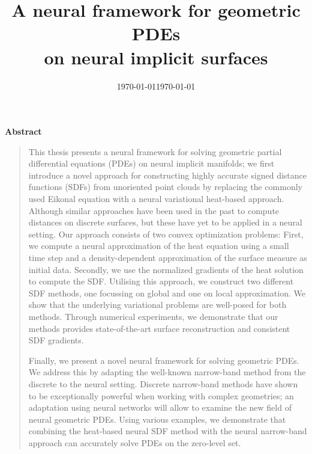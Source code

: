 \documentclass[12pt,openany]{book}
\date{\today}
\title{A neural framework for geometric PDEs\\on neural implicit surfaces}
\date{\today}
\theoremstyle{plainnormal}
\newenvironment{abstract}{
  \cleardoublepage
  \null\vfill
  \begin{center}\bfseries Abstract\end{center}
  \begin{quote}
}{
  \end{quote}
  \vfill\null
  \cleardoublepage
}
\theoremstyle{remark}
\begin{document}
\pagestyle{empty}

\maketitle

\pagestyle{headings}
\setcounter{page}{5}

\begingroup
\let\clearpage\relax

\begin{abstract}
This thesis presents a neural framework for solving geometric partial differential equations (PDEs) on neural implicit manifolds; we first introduce a novel approach for constructing highly accurate signed distance functions (SDFs) from unoriented point clouds by replacing the commonly used Eikonal equation with a neural variational heat-based approach. Although similar approaches have been used in the past to compute distances on discrete surfaces, but these have yet to be applied in a neural setting. Our approach consists of two convex optimization problems: First, we compute a neural approximation of the heat equation using a small time step and a density-dependent approximation of the surface measure as initial data. Secondly, we use the normalized gradients of the heat solution to compute the SDF. Utilising this approach, we construct two different SDF methods, one focussing on global and one on local approximation. We show that the underlying variational problems are well-posed for both methods.
Through numerical experiments, we demonstrate that our methods provides state-of-the-art surface reconstruction and consistent SDF gradients.\par
Finally, we present a novel neural framework for solving geometric PDEs. We address this by adapting the well-known narrow-band method from the discrete to the neural setting. Discrete narrow-band methods have shown to be exceptionally powerful when working with complex geometries; an adaptation using neural networks will allow to examine the new field of neural geometric PDEs. Using various examples, we demonstrate that combining the heat-based neural SDF method with the neural narrow-band approach can accurately solve PDEs on the zero-level set.
\end{abstract}
\end{document}
